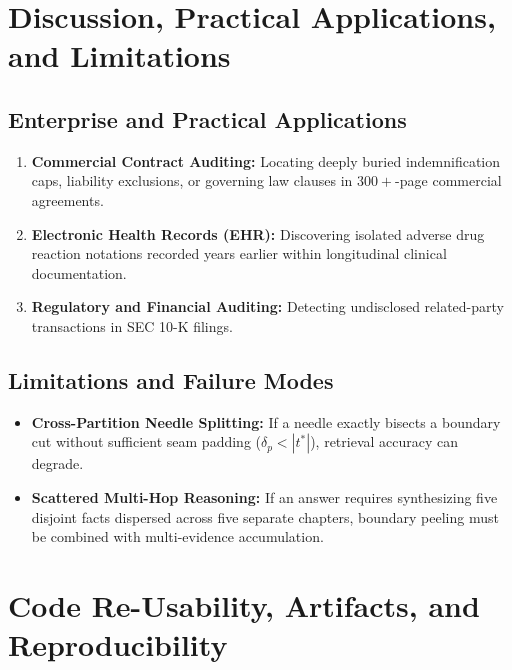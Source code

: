 \section{Discussion, Practical Applications, and Limitations}
\label{sec:discussion}

\subsection{Enterprise and Practical Applications}
\begin{enumerate}
    \item \textbf{Commercial Contract Auditing:} Locating deeply buried indemnification caps, liability exclusions, or governing law clauses in $300+$-page commercial agreements.
    \item \textbf{Electronic Health Records (EHR):} Discovering isolated adverse drug reaction notations recorded years earlier within longitudinal clinical documentation.
    \item \textbf{Regulatory and Financial Auditing:} Detecting undisclosed related-party transactions in SEC 10-K filings.
\end{enumerate}

\subsection{Limitations and Failure Modes}
\begin{itemize}
    \item \textbf{Cross-Partition Needle Splitting:} If a needle exactly bisects a boundary cut without sufficient seam padding ($\delta_p < |t^*|$), retrieval accuracy can degrade.
    \item \textbf{Scattered Multi-Hop Reasoning:} If an answer requires synthesizing five disjoint facts dispersed across five separate chapters, boundary peeling must be combined with multi-evidence accumulation.
\end{itemize}

\section{Code Re-Usability, Artifacts, and Reproducibility}
\label{sec:reproducibility}

